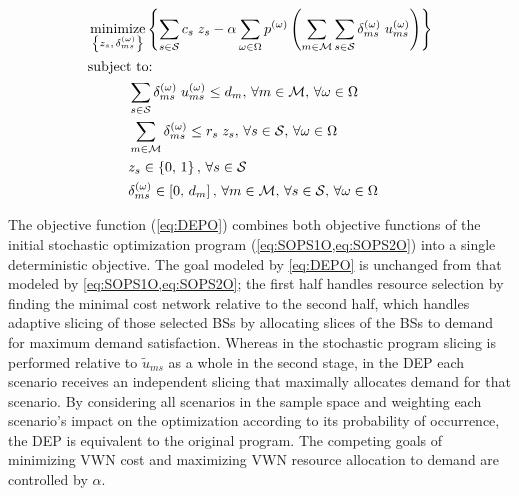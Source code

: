 \documentclass[12pt,dvipsnames]{report}
\DeclareMathOperator*{\argmin}{minimize}
\begin{document}
\begin{tcolorbox}[floatplacement = !ht, float, title = Deterministic Equivalent Program (DEP) of \Cref{eq:SOPS1O,eq:SOPS1C1,eq:SOPS2O,eq:SOPS2C1,eq:SOPS2C2,eq:SOPS2C3,eq:SOPS2C4}]
\begin{align}
& \argmin_{\left\{ z_s,\, \delta_{ms}^{\left( \omega \right)} \right\}} \left\{ \sum_{s \in \mathcal{S}} c_s \; z_s - \alpha \sum_{\omega \in \Omega} p^{\left( \omega \right)} \left( \sum_{m \in \mathcal{M}} \sum_{s \in \mathcal{S}} \delta_{ms}^{\left( \omega \right)} \; u_{ms}^{\left( \omega \right)} \right) \right\} \label{eq:DEPO}\\
& \text{subject to:} \nonumber \\
& \hspace{0.4in} \sum_{s \in \mathcal{S}} \delta_{ms}^{\left( \omega \right)} \; u_{ms}^{\left( \omega \right)} \leq d_m,\, \forall m \in \mathcal{M},\, \forall \omega \in \Omega \label{eq:DEPC1}\\
& \hspace{0.4in} \sum_{m \in \mathcal{M}} \delta_{ms}^{\left( \omega \right)} \leq r_s \; z_s,\, \forall s \in \mathcal{S},\, \forall \omega \in \Omega \label{eq:DEPC2}\\
& \hspace{0.4in} z_s \in \left\{ 0,\, 1 \right\},\, \forall s \in \mathcal{S} \label{eq:DEPC3}\\
& \hspace{0.4in} \delta_{ms}^{\left( \omega \right)} \in \left[ 0,\, d_m \right],\, \forall m \in \mathcal{M},\, \forall s \in \mathcal{S},\, \forall \omega \in \Omega \label{eq:DEPC4}
\end{align}
\end{tcolorbox}

The objective function (\cref{eq:DEPO}) combines both objective functions of the initial stochastic optimization program (\cref{eq:SOPS1O,eq:SOPS2O}) into a single deterministic objective.  The goal modeled by \cref{eq:DEPO} is unchanged from that modeled by \cref{eq:SOPS1O,eq:SOPS2O}; the first half handles resource selection by finding the minimal cost network relative to the second half, which handles adaptive slicing of those selected BSs by allocating slices of the BSs to demand for maximum demand satisfaction.  Whereas in the stochastic program slicing is performed relative to $\tilde{u}_{ms}$ as a whole in the second stage, in the DEP each scenario receives an independent slicing that maximally allocates demand for that scenario.  By considering all scenarios in the sample space and weighting each scenario's impact on the optimization according to its probability of occurrence, the DEP is equivalent to the original program.  The competing goals of minimizing VWN cost and maximizing VWN resource allocation to demand are controlled by $\alpha$.
\end{document}
